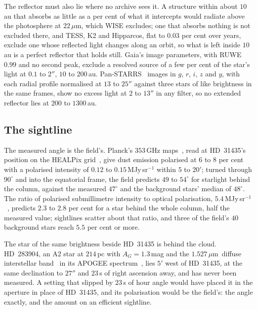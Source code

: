 \documentclass[3p,11pt]{elsarticle}
\newcommand{\um}{\,$\mu$m}
\begin{document}
The reflector must also lie where no archive sees it. A structure within about
$10$\,au that absorbs as little as a per cent of what it intercepts would radiate above
the photosphere at $22$\um, which WISE excludes; one that absorbs nothing is not
excluded there, and TESS, K2 and Hipparcos, flat to $0.03$ per cent over years, exclude
one whose reflected light changes along an orbit, so what is left inside $10$\,au is a
perfect reflector that holds still. Gaia's image parameters, with RUWE $0.99$ and no
second peak, exclude a resolved source of a few per cent of the star's light at $0.1$ to
$2''$, $10$ to $200$\,au. Pan-STARRS~\cite{Chambers2016} images in $g$, $r$, $i$, $z$
and $y$, with each radial profile normalised at $13$ to $25''$ against three stars of
like brightness in the same frames, show no excess light at $2$ to $13''$ in any filter,
so no extended reflector lies at $200$ to $1300$\,au.

\subsection{The sightline}

The measured angle is the field's. Planck's $353$\,GHz maps~\cite{Planck2020}, read at
HD~31435's position on the HEALPix grid~\cite{Gorski2005}, give dust emission polarised
at $6$ to $8$ per cent with a polarised intensity of $0.12$ to $0.15$\,MJy\,sr$^{-1}$
within $5$ to $20'$; turned through $90^\circ$ and into the equatorial frame, the field
predicts $49$ to $54^\circ$ for starlight behind the column, against the measured
$47^\circ$ and the background stars' median of $48^\circ$. The ratio of polarised
submillimetre intensity to optical polarisation, $5.4$\,MJy\,sr$^{-1}$~\cite{Planck2015},
predicts $2.3$ to $2.8$ per cent for a star behind the whole column, half the measured
value; sightlines scatter about that ratio, and three of the field's $40$ background
stars reach $5.5$ per cent or more.

The star of the same brightness beside HD~31435 is behind the cloud. HD~283904, an A2
star at $214$\,pc with $A_G=1.3$\,mag and the $1.527$\um\ diffuse interstellar
band~\cite{Zasowski2015} in its APOGEE spectrum~\cite{Majewski2017}, lies $5'$ west of
HD~31435, at the same declination to $27''$ and $23$\,s of right ascension away, and has
never been measured. A setting that slipped by $23$\,s of hour angle would have placed it
in the aperture in place of HD~31435, and its polarisation would be the field's: the
angle exactly, and the amount on an efficient sightline.
\end{document}
